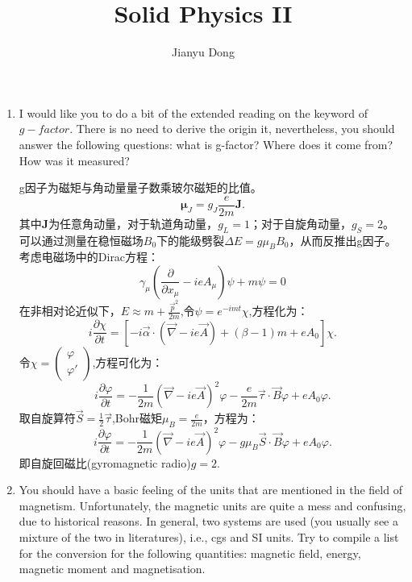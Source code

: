 \documentclass[reqno,a4paper,12pt]{amsart}
\title{Solid Physics II}
\author{Jianyu Dong}
\begin{document}
\maketitle		

\begin{enumerate}[1]

\item I would like you to do a bit of the extended reading on the keyword of $g-factor$. There is no need to derive the origin it, nevertheless, you should answer the following questions: what is g-factor? Where does it come from? How was it measured?

\begin{tcolorbox}[colback = black!5!white, colframe = black]
g因子为磁矩与角动量量子数乘玻尔磁矩的比值。
\[
	\boldsymbol{\mu}_J = g_J \frac{e}{2m} \boldsymbol{J}.
\]
其中$\boldsymbol{J}$为任意角动量，对于轨道角动量，$g_L = 1$；对于自旋角动量，$g_S = 2$。 \\
可以通过测量在稳恒磁场$B_0$下的能级劈裂$\Delta E = g\mu_B B_0$，从而反推出g因子。  \\
考虑电磁场中的Dirac方程：
\[
	\gamma_\mu\left( \frac{\partial}{\partial x_\mu} - ieA_\mu \right)\psi + m\psi = 0
\]
在非相对论近似下，$E \approx m+\frac{\vec{p}^2}{2m}$,令$\psi = e^{-imt}\chi$,方程化为：
\[
	i\frac{\partial \chi}{\partial t} = [-i\vec{\alpha}\cdot(\vec{\nabla} - ie\vec{A}) + (\beta-1)m + eA_0] \chi.
\]
令$\chi = \begin{pmatrix}
	\varphi \\
	\varphi'
\end{pmatrix}$,方程可化为：
\[
	i\frac{\partial \varphi}{\partial t} = -\frac{1}{2m}(\vec{\nabla}-ie\vec{A})^2 \varphi - \frac{e}{2m}\vec{\tau}\cdot \vec{B}\varphi +eA_0\varphi.
\]
取自旋算符$\vec{S} = \frac{1}{2}\vec{\tau}$,Bohr磁矩$\mu_B = \frac{e}{2m}$，方程为：
\[
	i\frac{\partial \varphi}{\partial t} = -\frac{1}{2m}(\vec{\nabla}-ie\vec{A})^2 \varphi - g\mu_B\vec{S}\cdot \vec{B}\varphi +eA_0\varphi.
\]
即自旋回磁比(gyromagnetic radio)$g=2$.
\end{tcolorbox}


\item You should have a basic feeling of the units that are mentioned in the field of magnetism. Unfortunately, the magnetic units are quite a mess and confusing, due to historical reasons. In general, two systems are used (you usually see a mixture of the two in literatures), i.e., cgs and SI units. Try to compile a list for the conversion for the following quantities: magnetic field, energy, magnetic moment and magnetisation.


\end{enumerate}
\end{document}
